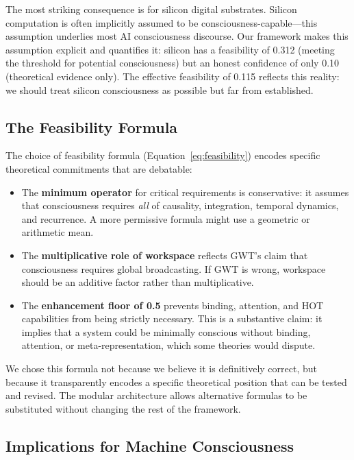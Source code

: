 \documentclass[12pt,a4paper]{article}
\begin{document}
The most striking consequence is for silicon digital substrates. Silicon computation is often implicitly assumed to be consciousness-capable---this assumption underlies most AI consciousness discourse. Our framework makes this assumption explicit and quantifies it: silicon has a feasibility of 0.312 (meeting the threshold for potential consciousness) but an honest confidence of only 0.10 (theoretical evidence only). The effective feasibility of 0.115 reflects this reality: we should treat silicon consciousness as possible but far from established.

\subsection{The Feasibility Formula}

The choice of feasibility formula (Equation~\ref{eq:feasibility}) encodes specific theoretical commitments that are debatable:

\begin{itemize}
    \item The \textbf{minimum operator} for critical requirements is conservative: it assumes that consciousness requires \emph{all} of causality, integration, temporal dynamics, and recurrence. A more permissive formula might use a geometric or arithmetic mean.
    \item The \textbf{multiplicative role of workspace} reflects GWT's claim that consciousness requires global broadcasting. If GWT is wrong, workspace should be an additive factor rather than multiplicative.
    \item The \textbf{enhancement floor of 0.5} prevents binding, attention, and HOT capabilities from being strictly necessary. This is a substantive claim: it implies that a system could be minimally conscious without binding, attention, or meta-representation, which some theories would dispute.
\end{itemize}

We chose this formula not because we believe it is definitively correct, but because it transparently encodes a specific theoretical position that can be tested and revised. The modular architecture allows alternative formulas to be substituted without changing the rest of the framework.

\subsection{Implications for Machine Consciousness}
\end{document}
